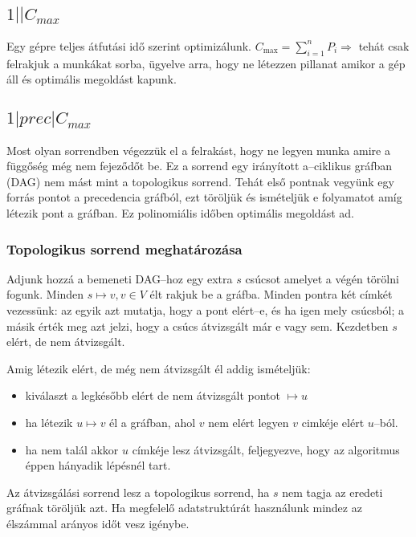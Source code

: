 \subsection{ \texorpdfstring {$ 1||C_{max} $} {1||Cmax} }

Egy gépre teljes átfutási idő szerint optimizálunk. $C_{\mbox{max}}=\sum_{i=1}^{n}
P_i \Rightarrow$ tehát csak felrakjuk a munkákat sorba, ügyelve arra, hogy ne 
létezzen pillanat amikor a gép áll és optimális megoldást kapunk.

\subsection{ \texorpdfstring {$ 1|prec|C_{max} $} {1|prec|Cmax} }

Most olyan sorrendben végezzük el a felrakást, hogy ne legyen munka amire a
függőség még nem fejeződőt be. Ez a sorrend egy irányított a--ciklikus gráfban
(DAG) nem mást mint a topologikus sorrend. Tehát első pontnak vegyünk egy forrás
pontot a precedencia gráfból, ezt töröljük és ismételjük e folyamatot amíg
létezik pont a gráfban. Ez polinomiális időben optimális megoldást ad.

\subsubsection{Topologikus sorrend meghatározása}

Adjunk hozzá a bemeneti DAG--hoz egy extra $s$ csúcsot amelyet a végén törölni
fogunk. Minden $s \mapsto v, v \in V$ élt rakjuk be a gráfba. Minden pontra két
címkét vezessünk: az egyik azt mutatja, hogy a pont elért--e, és ha igen mely
csúcsból; a másik érték meg azt jelzi, hogy a csúcs átvizsgált már e vagy sem.
Kezdetben $s$ elért, de nem átvizsgált.

Amig létezik elért, de még nem átvizsgált él addig ismételjük: 

\begin{itemize}
  \item kiválaszt a legkésőbb elért de nem átvizsgált pontot $\mapsto u$
  \item ha létezik $u \mapsto v$ él a gráfban, ahol $v$ nem elért legyen $v$
  cimkéje elért $u$--ból.
  \item ha nem talál akkor $u$ címkéje lesz átvizsgált, feljegyezve, hogy az 
  algoritmus éppen hányadik lépésnél tart.
\end{itemize}

Az átvizsgálási sorrend lesz a topologikus sorrend, ha $s$ nem tagja az eredeti
gráfnak töröljük azt. Ha megfelelő adatstruktúrát használunk mindez az élszámmal
arányos időt vesz igénybe.

